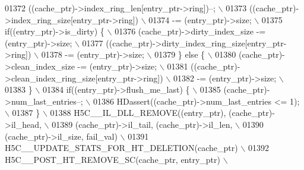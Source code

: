 \begin{DoxyCode}
01372 \textcolor{preprocessor}{    ((cache\_ptr)->index\_ring\_len[entry\_ptr->ring])--;                        \(\backslash\)}
01373 \textcolor{preprocessor}{    ((cache\_ptr)->index\_ring\_size[entry\_ptr->ring])                          \(\backslash\)}
01374 \textcolor{preprocessor}{            -= (entry\_ptr)->size;                                            \(\backslash\)}
01375 \textcolor{preprocessor}{    if((entry\_ptr)->is\_dirty) \{                                              \(\backslash\)}
01376 \textcolor{preprocessor}{        (cache\_ptr)->dirty\_index\_size -= (entry\_ptr)->size;                  \(\backslash\)}
01377 \textcolor{preprocessor}{        ((cache\_ptr)->dirty\_index\_ring\_size[entry\_ptr->ring])                \(\backslash\)}
01378 \textcolor{preprocessor}{                -= (entry\_ptr)->size;                                        \(\backslash\)}
01379 \textcolor{preprocessor}{    \} else \{                                                                 \(\backslash\)}
01380 \textcolor{preprocessor}{        (cache\_ptr)->clean\_index\_size -= (entry\_ptr)->size;                  \(\backslash\)}
01381 \textcolor{preprocessor}{        ((cache\_ptr)->clean\_index\_ring\_size[entry\_ptr->ring])                \(\backslash\)}
01382 \textcolor{preprocessor}{                -= (entry\_ptr)->size;                                        \(\backslash\)}
01383 \textcolor{preprocessor}{    \}                                                                        \(\backslash\)}
01384 \textcolor{preprocessor}{    if((entry\_ptr)->flush\_me\_last) \{                                         \(\backslash\)}
01385 \textcolor{preprocessor}{        (cache\_ptr)->num\_last\_entries--;                                     \(\backslash\)}
01386 \textcolor{preprocessor}{        HDassert((cache\_ptr)->num\_last\_entries <= 1);                        \(\backslash\)}
01387 \textcolor{preprocessor}{    \}                                                                        \(\backslash\)}
01388 \textcolor{preprocessor}{    H5C\_\_IL\_DLL\_REMOVE((entry\_ptr), (cache\_ptr)->il\_head,                    \(\backslash\)}
01389 \textcolor{preprocessor}{                       (cache\_ptr)->il\_tail, (cache\_ptr)->il\_len,            \(\backslash\)}
01390 \textcolor{preprocessor}{                       (cache\_ptr)->il\_size, fail\_val)                       \(\backslash\)}
01391 \textcolor{preprocessor}{    H5C\_\_UPDATE\_STATS\_FOR\_HT\_DELETION(cache\_ptr)                             \(\backslash\)}
01392 \textcolor{preprocessor}{    H5C\_\_POST\_HT\_REMOVE\_SC(cache\_ptr, entry\_ptr)                             \(\backslash\)}

\end{DoxyCode}
